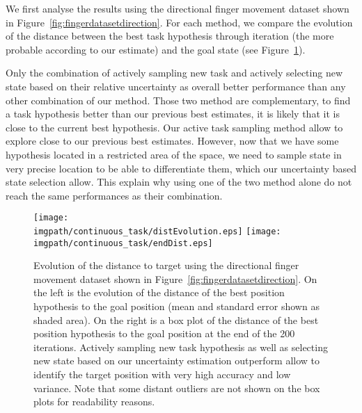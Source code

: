 We first analyse the results using the directional finger movement dataset shown in Figure~\ref{fig:fingerdatasetdirection}. For each method, we compare the evolution of the distance between the best task hypothesis through iteration (the more probable according to our estimate) and the goal state (see Figure~\ref{fig:continuoustaskdistevolution}).

Only the combination of actively sampling new task and actively selecting new state based on their relative uncertainty as overall better performance than any other combination of our method. Those two method are complementary, to find a task hypothesis better than our previous best estimates, it is likely that it is close to the current best hypothesis. Our active task sampling method allow to explore close to our previous best estimates. However, now that we have some hypothesis located in a restricted area of the space, we need to sample state in very precise location to be able to differentiate them, which our uncertainty based state selection allow. This explain why using one of the two method alone do not reach the same performances as their combination.

\begin{figure}[!ht]
\centering
\texttt{[image: \\imgpath/continuous\_task/distEvolution.eps]}
\texttt{[image: \\imgpath/continuous\_task/endDist.eps]}
\caption{Evolution of the distance to target using the directional finger movement dataset shown in Figure~\ref{fig:fingerdatasetdirection}. On the left is the evolution of the distance of the best position hypothesis to the goal position (mean and standard error shown as shaded area). On the right is a box plot of the distance of the best position hypothesis to the goal position at the end of the 200 iterations. Actively sampling new task hypothesis as well as selecting new state based on our uncertainty estimation outperform allow to identify the target position with very high accuracy and low variance. Note that some distant outliers are not shown on the box plots for readability reasons.}
\label{fig:continuoustaskdistevolution}
\end{figure}

